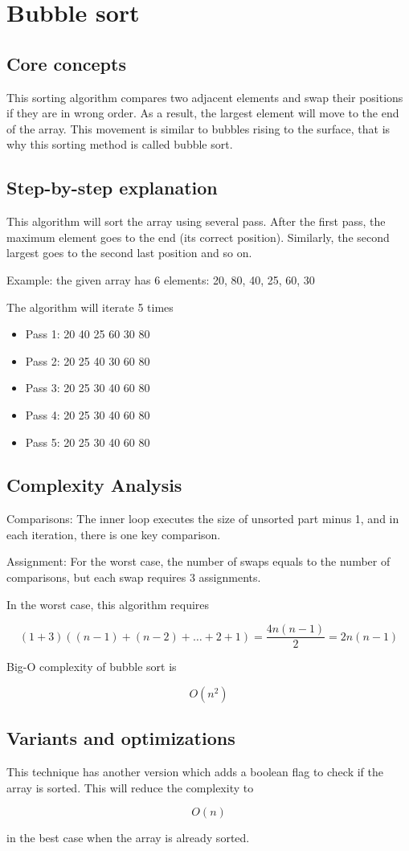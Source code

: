 \documentclass{article}
\begin{document}
\section{Bubble sort}
\subsection{Core concepts}
  This sorting algorithm compares two adjacent elements and swap their positions if they are in wrong order. As a result, the largest element will move to the end of the array. This movement is similar to bubbles rising to the surface, that is why this sorting method is called bubble sort.

\subsection{Step-by-step explanation}
  This algorithm will sort the array using several pass. After the first pass, the maximum element goes to the end (its correct position). Similarly, the second largest goes to the second last position and so on.

Example: the given array has 6 elements: 20, 80, 40, 25, 60, 30



The algorithm will iterate 5 times
\begin{itemize}
    \item Pass 1: 20 40 25 60 30 80 
    \item Pass 2: 20 25 40 30 60 80 
    \item Pass 3: 20 25 30 40 60 80 
    \item Pass 4: 20 25 30 40 60 80  
    \item Pass 5: 20 25 30 40 60 80  
\end{itemize}
 
 

\subsection{Complexity Analysis}

Comparisons:  
The inner loop executes the size of unsorted part minus 1, and in each iteration, there is one key comparison.

Assignment:  
For the worst case, the number of swaps equals to the number of comparisons, but each swap requires 3 assignments.

In the worst case, this algorithm requires

\[
(1+3)((n-1)+(n-2)+\dots+2+1)=\frac{4n(n-1)}{2}=2n(n-1)
\]

Big-O complexity of bubble sort is

\[
O(n^2)
\]

\subsection{Variants and optimizations}

This technique has another version which adds a boolean flag to check if the array is sorted. This will reduce the complexity to

\[
O(n)
\]

in the best case when the array is already sorted.
\end{document}

